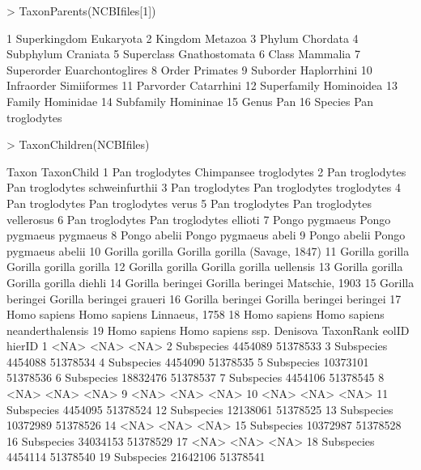 \documentclass[12pt]{article}
\begin{document}
\begin{Schunk}
\begin{Sinput}
> TaxonParents(NCBIfiles[1])
\end{Sinput}
\begin{Soutput}
1       Superkingdom Eukaryota
2              Kingdom Metazoa
3              Phylum Chordata
4           Subphylum Craniata
5     Superclass Gnathostomata
6               Class Mammalia
7  Superorder Euarchontoglires
8               Order Primates
9         Suborder Haplorrhini
10      Infraorder Simiiformes
11        Parvorder Catarrhini
12      Superfamily Hominoidea
13            Family Hominidae
14         Subfamily Homininae
15                   Genus Pan
16     Species Pan troglodytes
\end{Soutput}
\begin{Sinput}
> TaxonChildren(NCBIfiles)
\end{Sinput}
\begin{Soutput}
              Taxon                      TaxonChild
1   Pan troglodytes          Chimpansee troglodytes
2   Pan troglodytes  Pan troglodytes schweinfurthii
3   Pan troglodytes     Pan troglodytes troglodytes
4   Pan troglodytes           Pan troglodytes verus
5   Pan troglodytes      Pan troglodytes vellerosus
6   Pan troglodytes         Pan troglodytes ellioti
7    Pongo pygmaeus         Pongo pygmaeus pygmaeus
8      Pongo abelii            Pongo pygmaeus abeli
9      Pongo abelii           Pongo pygmaeus abelii
10  Gorilla gorilla  Gorilla gorilla (Savage, 1847)
11  Gorilla gorilla         Gorilla gorilla gorilla
12  Gorilla gorilla       Gorilla gorilla uellensis
13  Gorilla gorilla          Gorilla gorilla diehli
14 Gorilla beringei Gorilla beringei Matschie, 1903
15 Gorilla beringei        Gorilla beringei graueri
16 Gorilla beringei       Gorilla beringei beringei
17     Homo sapiens     Homo sapiens Linnaeus, 1758
18     Homo sapiens   Homo sapiens neanderthalensis
19     Homo sapiens      Homo sapiens ssp. Denisova
    TaxonRank    eolID   hierID
1        <NA>     <NA>     <NA>
2  Subspecies  4454089 51378533
3  Subspecies  4454088 51378534
4  Subspecies  4454090 51378535
5  Subspecies 10373101 51378536
6  Subspecies 18832476 51378537
7  Subspecies  4454106 51378545
8        <NA>     <NA>     <NA>
9        <NA>     <NA>     <NA>
10       <NA>     <NA>     <NA>
11 Subspecies  4454095 51378524
12 Subspecies 12138061 51378525
13 Subspecies 10372989 51378526
14       <NA>     <NA>     <NA>
15 Subspecies 10372987 51378528
16 Subspecies 34034153 51378529
17       <NA>     <NA>     <NA>
18 Subspecies  4454114 51378540
19 Subspecies 21642106 51378541
\end{Soutput}
\end{Schunk}
\end{document}
